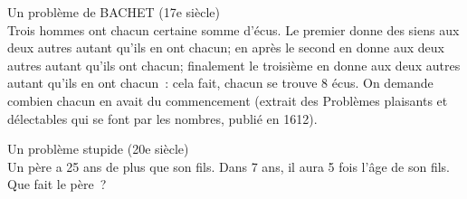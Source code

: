 \documentclass[12pt,french,oneside,a4paper]{memoir} %
\begin{document}
\begin{exo}
Un problème de BACHET (17e siècle) \\
\og Trois hommes ont chacun certaine somme d'écus. Le premier donne des 
siens aux deux autres autant qu'ils en ont chacun; en après le second en 
donne aux deux autres autant qu'ils ont chacun; finalement le 
troisième en donne aux deux autres autant qu'ils en ont chacun~: 
cela fait, chacun se trouve 8 écus. On demande combien chacun en 
avait du commencement\fg{} (extrait des \og Problèmes plaisants et 
délectables qui se font par les nombres\fg{}, publié en 1612).
\end{exo}
\begin{exo}
Un problème stupide (20e siècle) \\
Un père a 25 ans de plus que son fils. Dans 7 ans, il aura 5 fois 
l'âge de son fils. Que fait le père~?
\end{exo}
\end{document}
